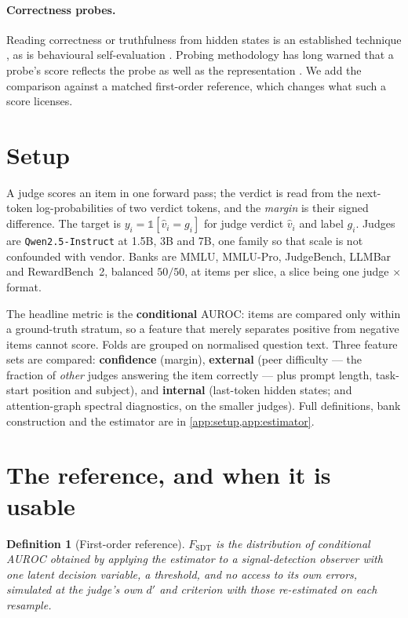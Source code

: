 \documentclass{article}
\newtheorem{definition}{Definition}
\begin{document}
\paragraph{Correctness probes.} Reading correctness or truthfulness from hidden states is an
established technique \citep{azaria2023}, as is behavioural self-evaluation \citep{kadavath2022}.
Probing methodology has long warned that a probe's score reflects the probe as well as the
representation \citep{hewitt2019control,belinkov2022}. We add the comparison against a matched
first-order reference, which changes what such a score licenses.

\section{Setup}
\label{sec:setup}

A judge scores an item in one forward pass; the verdict is read from the next-token log-probabilities
of two verdict tokens, and the \emph{margin} is their signed difference. The target is
$y_i = \mathbb{1}[\hat v_i = g_i]$ for judge verdict $\hat v_i$ and label $g_i$. Judges are
\texttt{Qwen2.5-Instruct} at 1.5B, 3B and 7B, one family so that scale is not confounded with
vendor. Banks are MMLU, MMLU-Pro, JudgeBench, LLMBar and RewardBench~2, balanced $50/50$, at
\NItemsPerSliceMain{} items per slice, a slice being one judge $\times$ format.

The headline metric is the \textbf{conditional} AUROC: items are compared only within a
ground-truth stratum, so a feature that merely separates positive from negative items cannot score.
Folds are grouped on normalised question text. Three feature sets are compared:
\textbf{confidence} (margin), \textbf{external} (peer difficulty --- the fraction of \emph{other}
judges answering the item correctly --- plus prompt length, task-start position and subject), and
\textbf{internal} (last-token hidden states; and attention-graph spectral diagnostics, on the
smaller judges). Full definitions, bank construction and the estimator are in
\cref{app:setup,app:estimator}.

\section{The reference, and when it is usable}
\label{sec:floors}

\begin{definition}[First-order reference]
\label{def:sdt}
$F_{\mathrm{SDT}}$ is the distribution of conditional AUROC obtained by applying the estimator to a
signal-detection observer with one latent decision variable, a threshold, and no access to its own
errors, simulated at the judge's own $d'$ and criterion with those re-estimated on each resample.
\end{definition}
\end{document}
